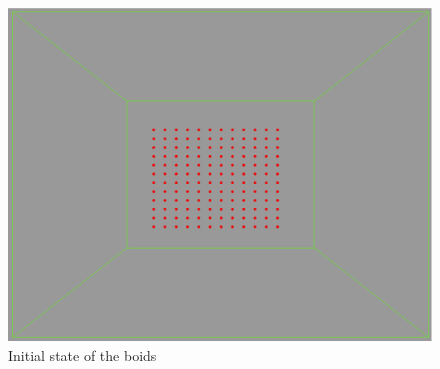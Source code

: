 \begin{figure}[htbp]
\begin{center}
\includegraphics[scale=0.15]{figures/align.pdf}
\caption{Initial state of the boids}
\label{alignRule}
\end{center}
\end{figure}

